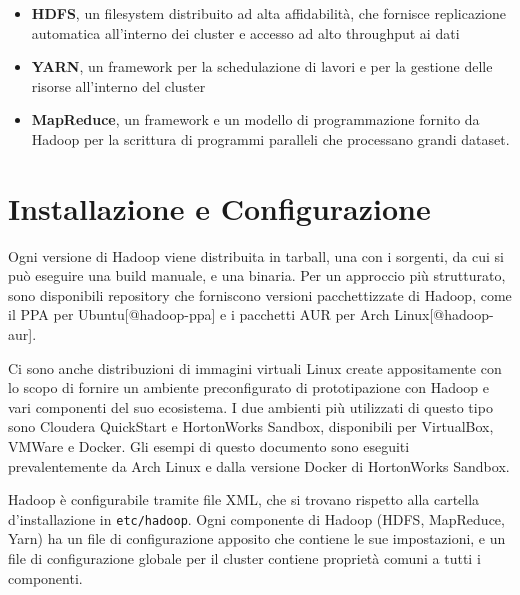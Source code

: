 \documentclass[italian,a4paper, twoside, 12pt]{report}
\begin{document}
\begin{itemize}
\item
  \textbf{HDFS}, un filesystem distribuito ad alta affidabilità, che
  fornisce replicazione automatica all'interno dei cluster e accesso ad
  alto throughput ai dati
\item
  \textbf{YARN}, un framework per la schedulazione di lavori e per la
  gestione delle risorse all'interno del cluster
\item
  \textbf{MapReduce}, un framework e un modello di programmazione
  fornito da Hadoop per la scrittura di programmi paralleli che
  processano grandi dataset.
\end{itemize}

\hypertarget{installazione-e-configurazione}{\section{Installazione e
Configurazione}\label{installazione-e-configurazione}}

Ogni versione di Hadoop viene distribuita in tarball, una con i
sorgenti, da cui si può eseguire una build manuale, e una binaria. Per
un approccio più strutturato, sono disponibili repository che forniscono
versioni pacchettizzate di Hadoop, come il PPA per
Ubuntu{[}@hadoop-ppa{]} e i pacchetti AUR per Arch
Linux{[}@hadoop-aur{]}.

Ci sono anche distribuzioni di immagini virtuali Linux create
appositamente con lo scopo di fornire un ambiente preconfigurato di
prototipazione con Hadoop e vari componenti del suo ecosistema. I due
ambienti più utilizzati di questo tipo sono Cloudera QuickStart e
HortonWorks Sandbox, disponibili per VirtualBox, VMWare e Docker. Gli
esempi di questo documento sono eseguiti prevalentemente da Arch Linux e
dalla versione Docker di HortonWorks Sandbox.

Hadoop è configurabile tramite file XML, che si trovano rispetto alla
cartella d'installazione in \lstinline!etc/hadoop!. Ogni componente di
Hadoop (HDFS, MapReduce, Yarn) ha un file di configurazione apposito che
contiene le sue impostazioni, e un file di configurazione globale per il
cluster contiene proprietà comuni a tutti i componenti.
\end{document}
